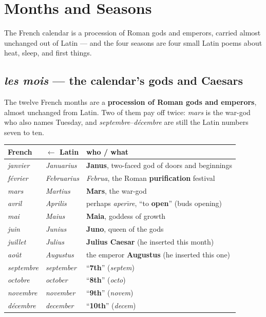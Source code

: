 \chapter{Months and Seasons}
\label{ch:months-seasons}

The French calendar is a procession of Roman gods and emperors, carried almost
unchanged out of Latin --- and the four seasons are four small Latin poems about
heat, sleep, and first things.

\section{\emph{les mois} --- the calendar's gods and Caesars}
\label{lesson:mois}

The twelve French months are a \textbf{procession of Roman gods and emperors},
almost unchanged from Latin. Two of them pay off twice: \emph{mars} is the
war-god who also names Tuesday, and \emph{septembre}--\emph{d\'{e}cembre} are
still the Latin numbers seven to ten.

\begin{center}
\begin{tabular}{@{}lll@{}}
\toprule
French & $\leftarrow$ Latin & who / what \\
\midrule
\emph{janvier} & \emph{Januarius} & \textbf{Janus}, two-faced god of doors and beginnings \\
\emph{f\'{e}vrier} & \emph{Februarius} & \emph{Februa}, the Roman \textbf{purification} festival \\
\emph{mars} & \emph{Martius} & \textbf{Mars}, the war-god \\
\emph{avril} & \emph{Aprilis} & perhaps \emph{aper\={\i}re}, ``to \textbf{open}'' (buds opening) \\
\emph{mai} & \emph{Maius} & \textbf{Maia}, goddess of growth \\
\emph{juin} & \emph{Junius} & \textbf{Juno}, queen of the gods \\
\emph{juillet} & \emph{Julius} & \textbf{Julius Caesar} (he inserted this month) \\
\emph{ao\^{u}t} & \emph{Augustus} & the emperor \textbf{Augustus} (he inserted this one) \\
\emph{septembre} & \emph{september} & ``\textbf{7th}'' (\emph{septem}) \\
\emph{octobre} & \emph{october} & ``\textbf{8th}'' (\emph{octo}) \\
\emph{novembre} & \emph{november} & ``\textbf{9th}'' (\emph{novem}) \\
\emph{d\'{e}cembre} & \emph{december} & ``\textbf{10th}'' (\emph{decem}) \\
\bottomrule
\end{tabular}
\end{center}

